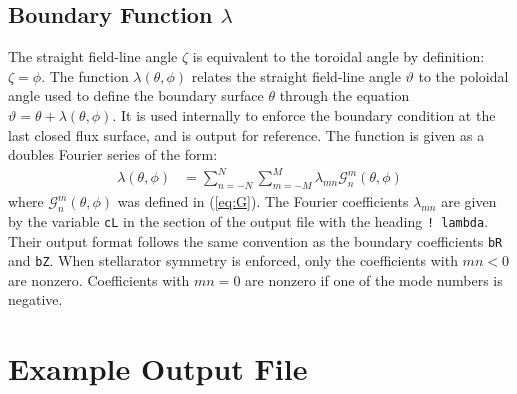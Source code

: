 \documentclass[10pt,a4paper]{article}
\begin{document}
\subsection*{Boundary Function $\lambda$}

The straight field-line angle $\zeta$ is equivalent to the toroidal angle by definition: $\zeta = \phi$.  
The function $\lambda(\theta,\phi)$ relates the straight field-line angle $\vartheta$ to the poloidal angle used to define the boundary surface $\theta$ through the equation $\vartheta = \theta + \lambda(\theta,\phi)$.  
It is used internally to enforce the boundary condition at the last closed flux surface, and is output for reference.  
The function is given as a doubles Fourier series of the form: 
%
\begin{subequations}
\begin{align}
\lambda(\theta,\phi) &= \sum_{n=-N}^{N} \sum_{m=-M}^{M} \lambda_{mn} \mathcal{G}^{m}_{n}(\theta,\phi)
\end{align}
\end{subequations}
%
where $\mathcal{G}^{m}_{n}(\theta,\phi)$ was defined in (\ref{eq:G}).  
The Fourier coefficients $\lambda_{mn}$ are given by the variable \verb|cL| in the section of the output file with the heading \verb|! lambda|.  
Their output format follows the same convention as the boundary coefficients \verb|bR| and \verb|bZ|.  
When stellarator symmetry is enforced, only the coefficients with $mn < 0$ are nonzero.  
Coefficients with $mn = 0$ are nonzero if one of the mode numbers is negative.  

\pagebreak

\section*{Example Output File}
\end{document}
